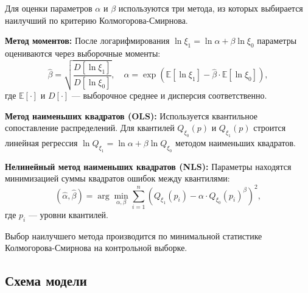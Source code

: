\documentclass[a4paper, 14pt]{extarticle}
\begin{document}
Для оценки параметров $\alpha$ и $\beta$ используются три метода, из которых выбирается наилучший по критерию Колмогорова-Смирнова.

\textbf{Метод моментов:} После логарифмирования $\ln \xi_1 = \ln \alpha + \beta \ln \xi_0$ параметры оцениваются через выборочные моменты:
\[
\hat{\beta} = \sqrt{\frac{D[\ln \xi_1]}{D[\ln \xi_0]}}, \quad
\hat{\alpha} = \exp\left(\mathbb{E}[\ln \xi_1] - \hat{\beta} \cdot \mathbb{E}[\ln \xi_0]\right),
\]
где $\mathbb{E}[\cdot]$ и $D[\cdot]$ --- выборочное среднее и дисперсия соответственно.

\textbf{Метод наименьших квадратов (OLS):} Используется квантильное сопоставление распределений. Для квантилей $Q_{\xi_0}(p)$ и $Q_{\xi_1}(p)$ строится линейная регрессия $\ln Q_{\xi_1} = \ln \alpha + \beta \ln Q_{\xi_0}$ методом наименьших квадратов.

\textbf{Нелинейный метод наименьших квадратов (NLS):} Параметры находятся минимизацией суммы квадратов ошибок между квантилями:
\[
(\hat{\alpha}, \hat{\beta}) = \arg\min_{\alpha, \beta} \sum_{i=1}^{n} (Q_{\xi_1}(p_i) - \alpha \cdot Q_{\xi_0}(p_i)^{\beta})^2,
\]
где $p_i$ --- уровни квантилей.

Выбор наилучшего метода производится по минимальной статистике Колмогорова-Смирнова на контрольной выборке.

\subsection{Схема модели}
\end{document}
